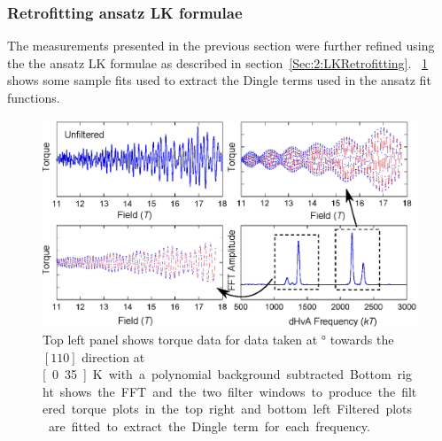 \subsubsection{Retrofitting ansatz LK formulae}

The measurements presented in the previous section were further refined using the the ansatz LK formulae as described in section~\ref{Sec:2:LKRetrofitting}. \Fig~\ref{Fig:3:DingleTermExtractionFits} shows some sample fits used to extract the Dingle terms used in the ansatz fit functions.
\begin{figure}[h!]
    \begin{center}
        \includegraphics[scale=0.9]{Chapter3-dHvABaFe2P2/Figures/Mass/FittingDingleTerm/FittingDingleTerm}
        \caption{Top left panel shows torque data for data taken at \unit[12]{\degree} towards the $[110]$ direction at \unit[0.35]{K} with a polynomial background subtracted. Bottom right shows the FFT and the two filter windows to produce the filtered torque plots in the top right and bottom left. Filtered plots are fitted to extract the Dingle term for each frequency.}
        \label{Fig:3:DingleTermExtractionFits}
    \end{center}
\end{figure}
